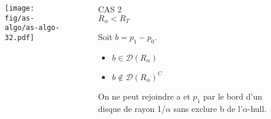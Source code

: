 \documentclass{beamer}
\begin{document}
\begin{frame}
\begin{columns}[t]
\begin{column}{7cm}
{\begin{figure}[h!]
      \end{figure}
      }
      {
        \begin{figure}[h!]
          \centering
          \texttt{[image: fig/as-algo/as-algo-32.pdf]}
      \end{figure}
      }
    \end{column}
    \begin{column}{3cm}
      \begin{block}{}
        {
          \alert{CAS 2}\\
          \alert{$R_{\alpha} < R_T$}

        }
        {
          Soit $b = p_{1} - p_{0}$.
          \begin{itemize}
            \item $b \in \mathcal{D} \left( R_{\alpha} \right)$
            \item $b \notin \mathcal{D} \left( R_{\alpha} \right)^C$
          \end{itemize}
          On ne peut rejoindre a et $p_1$ par le bord d'un disque de rayon 1/$\alpha$ sans exclure b de l'$\alpha$-hull.

}
\end{block}
\end{column}
\end{columns}
\end{frame}
\end{document}
